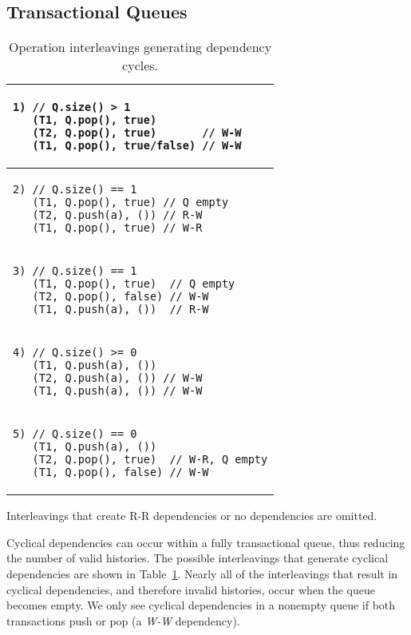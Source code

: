 \subsection{Transactional Queues}

\begin{table}
    \centering
    \begin{tabular}{|l|}
        \hline
\begin{lstlisting}
1) // Q.size() > 1 
   (T1, Q.pop(), true)  
   (T2, Q.pop(), true)       // W-W
   (T1, Q.pop(), true/false) // W-W
\end{lstlisting}
       \\ 
    \hline
\begin{lstlisting}
2) // Q.size() == 1  
   (T1, Q.pop(), true) // Q empty  
   (T2, Q.push(a), ()) // R-W
   (T1, Q.pop(), true) // W-R
    \end{lstlisting}
       \\ 
    \hline
\begin{lstlisting}
3) // Q.size() == 1  
   (T1, Q.pop(), true)  // Q empty  
   (T2, Q.pop(), false) // W-W     
   (T1, Q.push(a), ())  // R-W     
   \end{lstlisting} 
\\
\hline
\begin{lstlisting}
4) // Q.size() >= 0 
   (T1, Q.push(a), ()) 
   (T2, Q.push(a), ()) // W-W
   (T1, Q.push(a), ()) // W-W
\end{lstlisting}
\\
\hline
\begin{lstlisting}
5) // Q.size() == 0 
   (T1, Q.push(a), ())       
   (T2, Q.pop(), true)  // W-R, Q empty
   (T1, Q.pop(), false) // W-W
\end{lstlisting}
\\
    \hline
\end{tabular}
    \caption*{Interleavings that create R-R dependencies or no dependencies are omitted.}
    \caption{Operation interleavings generating dependency cycles.}
    \label{tab:interleavings}
\end{table}

Cyclical dependencies can occur within a fully transactional queue, thus reducing the number of valid histories. The possible interleavings that generate cyclical dependencies are shown in Table~\ref{tab:interleavings}. Nearly all of the interleavings that result in cyclical dependencies, and therefore invalid histories, occur when the queue becomes empty. 
We only see cyclical dependencies in a nonempty queue if both transactions push or pop (a \emph{W-W} dependency).


